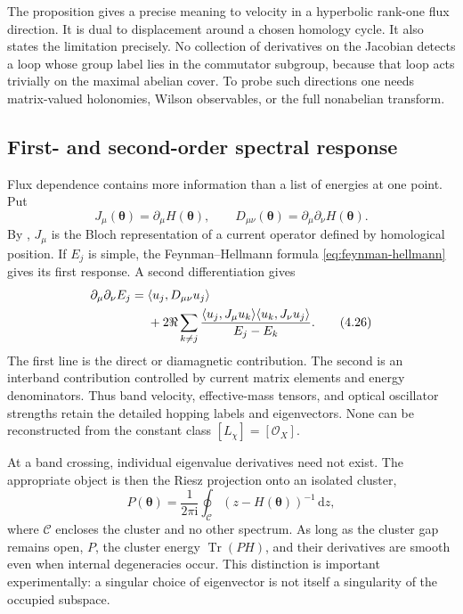 \documentclass[11pt]{article}
\theoremstyle{definition}
\theoremstyle{remark}
\newcommand{\Tr}{\operatorname{Tr}}
\newcommand{\cO}{\mathcal O}
\newcommand{\dd}{\mathrm d}
\newcommand{\ii}{\mathrm i}
\begin{document}
The proposition gives a precise meaning to velocity in a hyperbolic
rank-one flux direction.  It is dual to displacement around a chosen
homology cycle.  It also states the limitation precisely.  No collection of
derivatives on the Jacobian detects a loop whose group label lies in the
commutator subgroup, because that loop acts trivially on the maximal abelian
cover.  To probe such directions one needs matrix-valued holonomies, Wilson
observables, or the full nonabelian transform.

\subsection{First- and second-order spectral response}

Flux dependence contains more information than a list of energies at one
point.  Put
\[
       J_\mu(\bm\theta)=\partial_\mu H(\bm\theta),\qquad
       D_{\mu\nu}(\bm\theta)=\partial_\mu\partial_\nu H(\bm\theta).
       \tag{4.25}\label{eq:current-diamagnetic}
\]
By , \(J_\mu\) is the Bloch representation of a
current operator defined by homological position.  If \(E_j\) is simple, the
Feynman--Hellmann formula \eqref{eq:feynman-hellmann} gives its first
response.  A second differentiation gives
\begin{align}
 \partial_\mu\partial_\nu E_j
   ={}&\langle u_j,D_{\mu\nu}u_j\rangle \notag\\
    &+2\Re\sum_{k\neq j}
       \frac{
        \langle u_j,J_\mu u_k\rangle
        \langle u_k,J_\nu u_j\rangle}
       {E_j-E_k}.
       \tag{4.26}\label{eq:second-order-response}
\end{align}
The first line is the direct or diamagnetic contribution.  The second is an
interband contribution controlled by current matrix elements and energy
denominators.  Thus band velocity, effective-mass tensors, and optical
oscillator strengths retain the detailed hopping labels and eigenvectors.
None can be reconstructed from the constant class
\([L_\chi]=[\cO_X]\).

At a band crossing, individual eigenvalue derivatives need not exist.  The
appropriate object is then the Riesz projection onto an isolated cluster,
\[
            P(\bm\theta)
              =\frac{1}{2\pi\ii}\oint_\mathcal C
                 (z-H(\bm\theta))^{-1}\,\dd z,
                 \tag{4.27}\label{eq:riesz-cluster}
\]
where \(\mathcal C\) encloses the cluster and no other spectrum.  As long as
the cluster gap remains open, \(P\), the cluster energy
\(\Tr(PH)\), and their derivatives are smooth even when internal
degeneracies occur.  This distinction is important experimentally: a
singular choice of eigenvector is not itself a singularity of the occupied
subspace.
\end{document}
